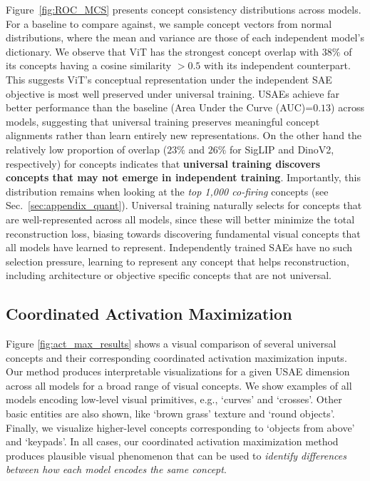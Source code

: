 Figure~\ref{fig:ROC_MCS} presents concept consistency distributions across models. For a baseline to compare against, we sample concept vectors from normal distributions, where the mean and variance are those of each independent model's dictionary. We observe that ViT has the strongest concept overlap with $38\%$ of its concepts having a cosine similarity $>0.5$ with its independent counterpart. This suggests ViT's conceptual representation under the independent SAE objective is most well preserved under universal training. USAEs achieve far better performance than the baseline (Area Under the Curve (AUC)=$0.13$) across models, suggesting that universal training preserves meaningful concept alignments rather than learn entirely new representations. On the other hand the relatively low proportion of overlap ($23\%$ and $26\%$ for SigLIP and DinoV2, respectively) for concepts indicates that \textbf{universal training discovers concepts that may not emerge in independent training}. 
Importantly, this distribution remains when looking at the \textit{top 1,000 co-firing} concepts (see Sec.~\ref{sec:appendix_quant}). 
Universal training naturally selects for concepts that are well-represented across all models, since these will better minimize the total reconstruction loss, biasing towards discovering fundamental visual concepts that all models have learned to represent. Independently trained SAEs have no such selection pressure, learning to represent any concept that helps reconstruction, including architecture or objective specific concepts that are not universal.   

\vspace{-3mm}
\subsection{Coordinated Activation Maximization}\label{sec:act_max_results}
\vspace{-1mm}
Figure \ref{fig:act_max_results}
shows a visual comparison of several universal concepts and their corresponding coordinated activation maximization inputs. Our method produces interpretable visualizations for a given USAE dimension across all models for a broad range of visual concepts. We show examples of all models encoding low-level visual primitives, e.g., `curves' and `crosses'. Other basic entities are also shown, like `brown grass' texture and `round objects'. Finally, we visualize higher-level concepts corresponding to `objects from above' and `keypads'. In all cases, %
our coordinated activation maximization method produces plausible visual phenomenon that can be used to \textit{identify differences between how each model encodes the same concept}. 

